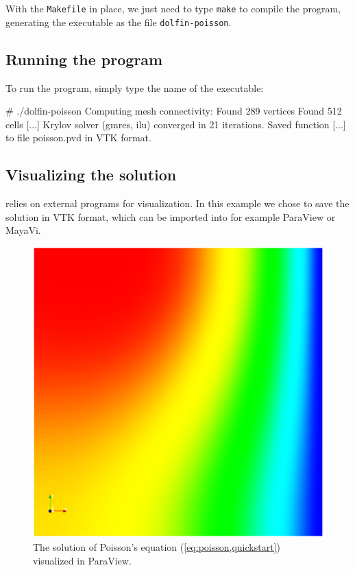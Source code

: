 With the \texttt{Makefile} in place, we just need to type
\texttt{make} to compile the program, generating the executable
as the file \texttt{dolfin-poisson}.

\subsection{Running the program}

To run the program, simply type the name of the executable:
\begin{code}
  # ./dolfin-poisson
  Computing mesh connectivity:
  Found 289 vertices
  Found 512 cells
  [...]
  Krylov solver (gmres, ilu) converged in 21 iterations.
  Saved function [...] to file poisson.pvd in VTK format.
\end{code}

\subsection{Visualizing the solution}

\dolfin{} relies on external programs for visualization. In this
example we chose to save the solution in VTK format, which can be
imported into for example ParaView or MayaVi.

\begin{figure}[htbp]
  \begin{center}
    \includegraphics[width=12cm]{eps/poisson.eps}
    \caption{The solution of Poisson's equation (\ref{eq:poisson,quickstart})
      visualized in ParaView.}
  \end{center}
\end{figure}
